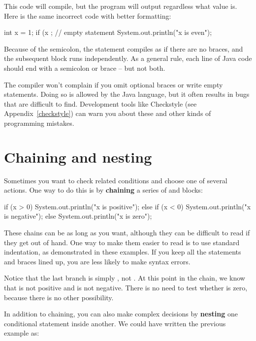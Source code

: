 This code will compile, but the program will output  regardless what value  is.
Here is the same incorrect code with better formatting:

\begin{code}
int x = 1;
if (x %
    ;  // empty statement
{
    System.out.println("x is even");
}
\end{code}

Because of the semicolon, the  statement compiles as if there are no braces, and the subsequent block runs independently.
As a general rule, each line of Java code should end with a semicolon or brace -- but not both.

The compiler won't complain if you omit optional braces or write empty statements.
Doing so is allowed by the Java language, but it often results in bugs that are difficult to find.
Development tools like Checkstyle (see Appendix~\ref{checkstyle}) can warn you about these and other kinds of programming mistakes.


\section{Chaining and nesting}


Sometimes you want to check related conditions and choose one of several actions.
One way to do this is by {\bf chaining} a series of  and  blocks:

\begin{code}
if (x > 0) {
    System.out.println("x is positive");
} else if (x < 0) {
    System.out.println("x is negative");
} else {
    System.out.println("x is zero");
}
\end{code}

These chains can be as long as you want, although they can be difficult to read if they get out of hand.
One way to make them easier to read is to use standard indentation, as demonstrated in these examples.
If you keep all the statements and braces lined up, you are less likely to make syntax errors.

Notice that the last branch is simply , not .
At this point in the chain, we know that  is not positive and  is not negative.
There is no need to test whether  is zero, because there is no other possibility.


In addition to chaining, you can also make complex decisions by {\bf nesting} one conditional statement inside another.
We could have written the previous example as:

